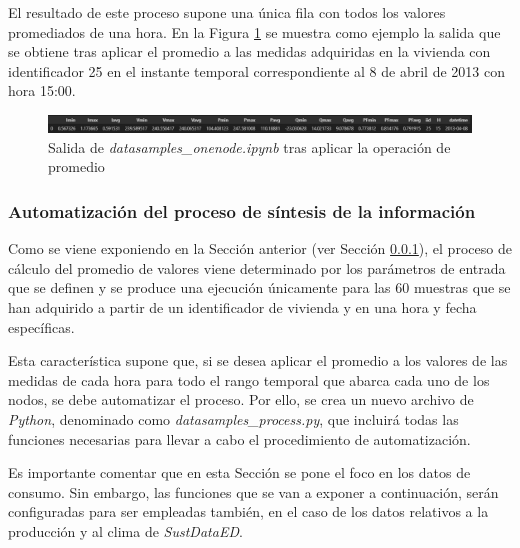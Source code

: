 \vspace{3mm}

El resultado de este proceso supone una única fila con todos los valores promediados de una hora. En la Figura \ref{fig:datasamples} se muestra como ejemplo la salida que se obtiene tras aplicar el promedio a las medidas adquiridas en la vivienda con identificador 25 en el instante temporal correspondiente al 8 de abril de 2013 con hora 15:00.

\vspace{3mm}

\begin{figure}[h!]
  \centering
  \includegraphics[width=1\textwidth]{img/diseno/datasamples.png}
  \caption{Salida de \textit{datasamples\_onenode.ipynb} tras aplicar la operación de promedio}
  \label{fig:datasamples}
\end{figure}

\subsubsection{Automatización del proceso de síntesis de la información}
\label{sec:datasamples}

Como se viene exponiendo en la Sección anterior (ver Sección \ref{sec:datasamples}), el proceso de cálculo del promedio de valores viene determinado por los parámetros de entrada que se definen y se produce una ejecución únicamente para las 60 muestras que se han adquirido a partir de un identificador de vivienda y en una hora y fecha específicas. 

\vspace{3mm}

Esta característica supone que, si se desea aplicar el promedio a los valores de las medidas de cada hora para todo el rango temporal que abarca cada uno de los nodos, se debe automatizar el proceso. Por ello, se crea un nuevo archivo de \textit{Python}, denominado como \textit{datasamples\_process.py}, que incluirá todas las funciones necesarias para llevar a cabo el procedimiento de automatización. 

\vspace{3mm}

Es importante comentar que en esta Sección se pone el foco en los datos de consumo. Sin embargo, las funciones que se van a exponer a continuación, serán configuradas para ser empleadas también, en el caso de los datos relativos a la producción y al clima de \textit{SustDataED}.

